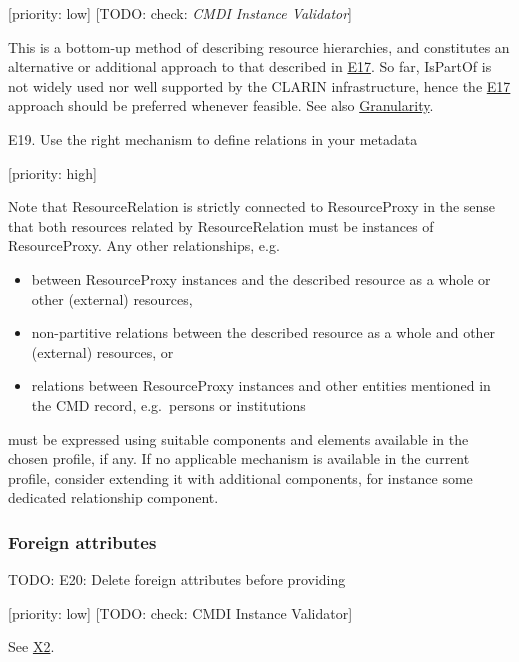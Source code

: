 {[}priority: low{]} {[}TODO: check: \emph{CMDI Instance Validator}{]}

This is a bottom-up method of describing resource hierarchies, and
constitutes an alternative or additional approach to that described in
\protect\hyperlink{e17-use-resourceproxy-to-express-partitive-relationships-between-the-described-resource-as-a-whole-and-its-constituent-resources}{E17}.
So far, IsPartOf is not widely used nor well supported by the CLARIN
infrastructure, hence the
\protect\hyperlink{e17-use-resourceproxy-to-express-partitive-relationships-between-the-described-resource-as-a-whole-and-its-constituent-resources}{E17}
approach should be preferred whenever feasible. See also
\href{/common_approachesproblems/granularity.md}{Granularity}.

E19. Use the right mechanism to define relations in your metadata

{[}priority: high{]}

Note that ResourceRelation is strictly connected to ResourceProxy in the
sense that both resources related by ResourceRelation must be instances
of ResourceProxy. Any other relationships, e.g.

\begin{itemize}
\tightlist
\item
  between ResourceProxy instances and the described resource as a whole
  or other (external) resources,
\item
  non-partitive relations between the described resource as a whole and
  other (external) resources, or
\item
  relations between ResourceProxy instances and other entities mentioned
  in the CMD record, e.g.~persons or institutions
\end{itemize}

must be expressed using suitable components and elements available in
the chosen profile, if any. If no applicable mechanism is available in
the current profile, consider extending it with additional components,
for instance some dedicated relationship component.

\subsubsection{Foreign attributes}\label{foreign-attributes}

TODO: E20: Delete foreign attributes before providing

{[}priority: low{]} {[}TODO: check: CMDI Instance Validator{]}

See \href{/authoring_component_metadata_records/general_xml.md\#x2}{X2}.
